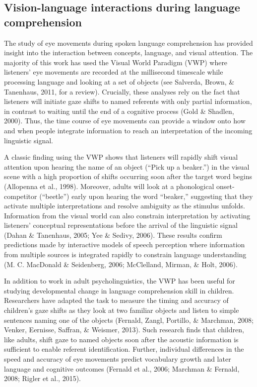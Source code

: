 \documentclass[,man,floatsintext]{apa6}
\begin{document}
\subsection{Vision-language interactions during language
comprehension}\label{vision-language-interactions-during-language-comprehension}

The study of eye movements during spoken language comprehension has
provided insight into the interaction between concepts, language, and
visual attention. The majority of this work has used the Visual World
Paradigm (VWP) where listeners' eye movements are recorded at the
millisecond timescale while processing language and looking at a set of
objects (see Salverda, Brown, \& Tanenhaus, 2011, for a review).
Crucially, these analyses rely on the fact that listeners will initiate
gaze shifts to named referents with only partial information, in
contrast to waiting until the end of a cognitive process (Gold \&
Shadlen, 2000). Thus, the time course of eye movements can provide a
window onto how and when people integrate information to reach an
interpretation of the incoming linguistic signal.

A classic finding using the VWP shows that listeners will rapidly shift
visual attention upon hearing the name of an object (\enquote{Pick up a
beaker.}) in the visual scene with a high proportion of shifts occurring
soon after the target word begins (Allopenna et al., 1998). Moreover,
adults will look at a phonological onset-competitor (\enquote{beetle})
early upon hearing the word \enquote{beaker,} suggesting that they
activate multiple interpretations and resolve ambiguity as the stimulus
unfolds. Information from the visual world can also constrain
interpretation by activating listeners' conceptual representations
before the arrival of the linguistic signal (Dahan \& Tanenhaus, 2005;
Yee \& Sedivy, 2006). These results confirm predictions made by
interactive models of speech perception where information from multiple
sources is integrated rapidly to constrain language understanding (M. C.
MacDonald \& Seidenberg, 2006; McClelland, Mirman, \& Holt, 2006).

In addition to work in adult psycholinguistics, the VWP has been useful
for studying developmental change in language comprehension skill in
children. Researchers have adapted the task to measure the timing and
accuracy of children's gaze shifts as they look at two familiar objects
and listen to simple sentences naming one of the objects (Fernald,
Zangl, Portillo, \& Marchman, 2008; Venker, Eernisse, Saffran, \&
Weismer, 2013). Such research finds that children, like adults, shift
gaze to named objects soon after the acoustic information is sufficient
to enable referent identification. Further, individual differences in
the speed and accuracy of eye movements predict vocabulary growth and
later language and cognitive outcomes (Fernald et al., 2006; Marchman \&
Fernald, 2008; Rigler et al., 2015).
\end{document}
